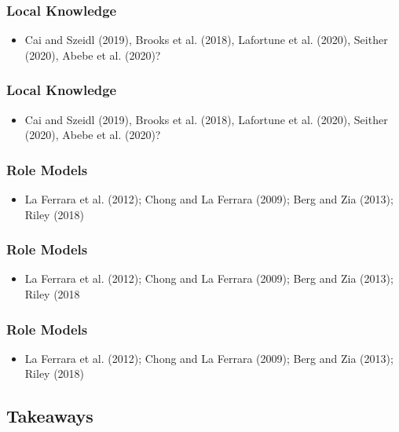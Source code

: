 \documentclass[hideothersubsections, usenames,dvipsnames,10pt]{beamer}
\begin{document}
\begin{frame}
\frametitle{Local Knowledge}
	\begin{itemize}
	\item Cai and Szeidl (2019), Brooks et al. (2018), Lafortune et al. (2020), Seither (2020), Abebe et al. (2020)?
	\vspace{0.1in}
	\end{itemize}
\end{frame}

\begin{frame}
\frametitle{Local Knowledge}
	\begin{itemize}
	\item Cai and Szeidl (2019), Brooks et al. (2018), Lafortune et al. (2020), Seither (2020), Abebe et al. (2020)?
	\vspace{0.1in}
	\end{itemize}
\end{frame}


\begin{frame}
\frametitle{Role Models}
	\begin{itemize}
	\item  La Ferrara et al. (2012); Chong and La Ferrara (2009); Berg and Zia (2013); Riley (2018)
	\vspace{0.1in}
	\end{itemize}
\end{frame}

\begin{frame}
\frametitle{Role Models}
	\begin{itemize}
	\item  La Ferrara et al. (2012); Chong and La Ferrara (2009); Berg and Zia (2013); Riley (2018
	\vspace{0.1in}
	\end{itemize}
\end{frame}

\begin{frame}
\frametitle{Role Models}
	\begin{itemize}
	\item  La Ferrara et al. (2012); Chong and La Ferrara (2009); Berg and Zia (2013); Riley (2018)
	\vspace{0.1in}
	\end{itemize}
\end{frame}



\subsection{Takeaways}
\end{document}
